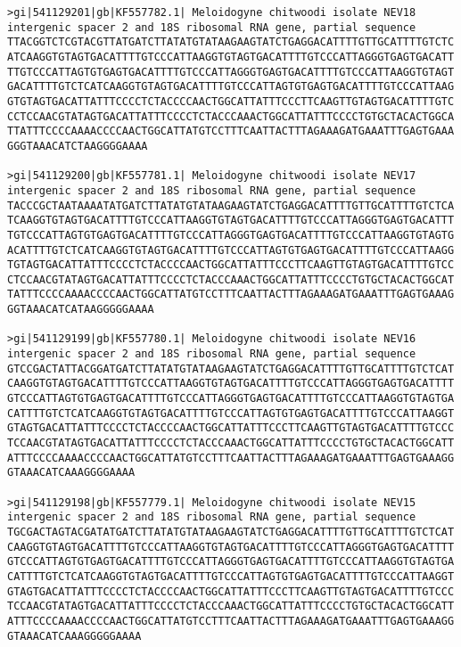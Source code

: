 \documentclass[11pt]{article}
\begin{document}
\begin{Verbatim}[commandchars=\\\{\}]
>gi|541129201|gb|KF557782.1| Meloidogyne chitwoodi isolate NEV18 intergenic spacer 2 and 18S ribosomal RNA gene, partial sequence
TTACGGTCTCGTACGTTATGATCTTATATGTATAAGAAGTATCTGAGGACATTTTGTTGCATTTTGTCTC
ATCAAGGTGTAGTGACATTTTGTCCCATTAAGGTGTAGTGACATTTTGTCCCATTAGGGTGAGTGACATT
TTGTCCCATTAGTGTGAGTGACATTTTGTCCCATTAGGGTGAGTGACATTTTGTCCCATTAAGGTGTAGT
GACATTTTGTCTCATCAAGGTGTAGTGACATTTTGTCCCATTAGTGTGAGTGACATTTTGTCCCATTAAG
GTGTAGTGACATTATTTCCCCTCTACCCCAACTGGCATTATTTCCCTTCAAGTTGTAGTGACATTTTGTC
CCTCCAACGTATAGTGACATTATTTCCCCTCTACCCAAACTGGCATTATTTCCCCTGTGCTACACTGGCA
TTATTTCCCCAAAACCCCAACTGGCATTATGTCCTTTCAATTACTTTAGAAAGATGAAATTTGAGTGAAA
GGGTAAACATCTAAGGGGAAAA

>gi|541129200|gb|KF557781.1| Meloidogyne chitwoodi isolate NEV17 intergenic spacer 2 and 18S ribosomal RNA gene, partial sequence
TACCCGCTAATAAAATATGATCTTATATGTATAAGAAGTATCTGAGGACATTTTGTTGCATTTTGTCTCA
TCAAGGTGTAGTGACATTTTGTCCCATTAAGGTGTAGTGACATTTTGTCCCATTAGGGTGAGTGACATTT
TGTCCCATTAGTGTGAGTGACATTTTGTCCCATTAGGGTGAGTGACATTTTGTCCCATTAAGGTGTAGTG
ACATTTTGTCTCATCAAGGTGTAGTGACATTTTGTCCCATTAGTGTGAGTGACATTTTGTCCCATTAAGG
TGTAGTGACATTATTTCCCCTCTACCCCAACTGGCATTATTTCCCTTCAAGTTGTAGTGACATTTTGTCC
CTCCAACGTATAGTGACATTATTTCCCCTCTACCCAAACTGGCATTATTTCCCCTGTGCTACACTGGCAT
TATTTCCCCAAAACCCCAACTGGCATTATGTCCTTTCAATTACTTTAGAAAGATGAAATTTGAGTGAAAG
GGTAAACATCATAAGGGGGAAAA

>gi|541129199|gb|KF557780.1| Meloidogyne chitwoodi isolate NEV16 intergenic spacer 2 and 18S ribosomal RNA gene, partial sequence
GTCCGACTATTACGGATGATCTTATATGTATAAGAAGTATCTGAGGACATTTTGTTGCATTTTGTCTCAT
CAAGGTGTAGTGACATTTTGTCCCATTAAGGTGTAGTGACATTTTGTCCCATTAGGGTGAGTGACATTTT
GTCCCATTAGTGTGAGTGACATTTTGTCCCATTAGGGTGAGTGACATTTTGTCCCATTAAGGTGTAGTGA
CATTTTGTCTCATCAAGGTGTAGTGACATTTTGTCCCATTAGTGTGAGTGACATTTTGTCCCATTAAGGT
GTAGTGACATTATTTCCCCTCTACCCCAACTGGCATTATTTCCCTTCAAGTTGTAGTGACATTTTGTCCC
TCCAACGTATAGTGACATTATTTCCCCTCTACCCAAACTGGCATTATTTCCCCTGTGCTACACTGGCATT
ATTTCCCCAAAACCCCAACTGGCATTATGTCCTTTCAATTACTTTAGAAAGATGAAATTTGAGTGAAAGG
GTAAACATCAAAGGGGAAAA

>gi|541129198|gb|KF557779.1| Meloidogyne chitwoodi isolate NEV15 intergenic spacer 2 and 18S ribosomal RNA gene, partial sequence
TGCGACTAGTACGATATGATCTTATATGTATAAGAAGTATCTGAGGACATTTTGTTGCATTTTGTCTCAT
CAAGGTGTAGTGACATTTTGTCCCATTAAGGTGTAGTGACATTTTGTCCCATTAGGGTGAGTGACATTTT
GTCCCATTAGTGTGAGTGACATTTTGTCCCATTAGGGTGAGTGACATTTTGTCCCATTAAGGTGTAGTGA
CATTTTGTCTCATCAAGGTGTAGTGACATTTTGTCCCATTAGTGTGAGTGACATTTTGTCCCATTAAGGT
GTAGTGACATTATTTCCCCTCTACCCCAACTGGCATTATTTCCCTTCAAGTTGTAGTGACATTTTGTCCC
TCCAACGTATAGTGACATTATTTCCCCTCTACCCAAACTGGCATTATTTCCCCTGTGCTACACTGGCATT
ATTTCCCCAAAACCCCAACTGGCATTATGTCCTTTCAATTACTTTAGAAAGATGAAATTTGAGTGAAAGG
GTAAACATCAAAGGGGGAAAA


\end{Verbatim}
\end{document}
